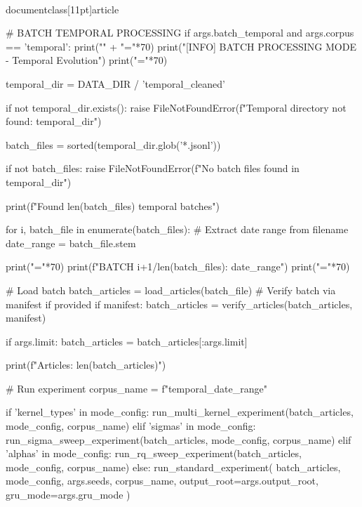 \\documentclass[11pt]{article}
\begin{document}
\begin{CodeBlock}
    # BATCH TEMPORAL PROCESSING
    if args.batch_temporal and args.corpus == 'temporal':
        print("\n" + "="*70)
        print("[INFO] BATCH PROCESSING MODE - Temporal Evolution")
        print("="*70)
        
        temporal_dir = DATA_DIR / 'temporal_cleaned'
        
        if not temporal_dir.exists():
            raise FileNotFoundError(f"Temporal directory not found: {temporal_dir}")
        
        batch_files = sorted(temporal_dir.glob('*.jsonl'))
        
        if not batch_files:
            raise FileNotFoundError(f"No batch files found in {temporal_dir}")
        
        print(f"Found {len(batch_files)} temporal batches\n")
        
        for i, batch_file in enumerate(batch_files):
            # Extract date range from filename
            date_range = batch_file.stem
            
            print("="*70)
            print(f"BATCH {i+1}/{len(batch_files)}: {date_range}")
            print("="*70)
            
            # Load batch
            batch_articles = load_articles(batch_file)
            # Verify batch via manifest if provided
            if manifest:
                batch_articles = verify_articles(batch_articles, manifest)
            
            if args.limit:
                batch_articles = batch_articles[:args.limit]
            
            print(f"Articles: {len(batch_articles)}")
            
            # Run experiment
            corpus_name = f"temporal_{date_range}"
            
            if 'kernel_types' in mode_config:
                run_multi_kernel_experiment(batch_articles, mode_config, corpus_name)
            elif 'sigmas' in mode_config:
                run_sigma_sweep_experiment(batch_articles, mode_config, corpus_name)
            elif 'alphas' in mode_config:
                run_rq_sweep_experiment(batch_articles, mode_config, corpus_name)
            else:
                run_standard_experiment(
                    batch_articles,
                    mode_config,
                    args.seeds,
                    corpus_name,
                    output_root=args.output_root,
                    gru_mode=args.gru_mode
                )
            

\end{CodeBlock}
\end{document}
